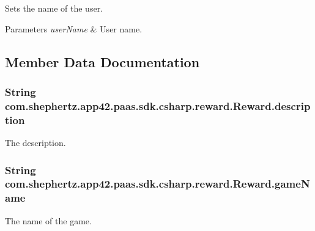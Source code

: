 Sets the name of the user. 


\begin{DoxyParams}{Parameters}
{\em user\+Name} & User name.\\
\hline
\end{DoxyParams}


\subsection{Member Data Documentation}
\hypertarget{classcom_1_1shephertz_1_1app42_1_1paas_1_1sdk_1_1csharp_1_1reward_1_1_reward_af47d9b6832d16cea33fbb19207ad0c5a}{
\subsubsection[{description}]{\setlength{\rightskip}{0pt plus 5cm}String com.\+shephertz.\+app42.\+paas.\+sdk.\+csharp.\+reward.\+Reward.\+description}}\label{classcom_1_1shephertz_1_1app42_1_1paas_1_1sdk_1_1csharp_1_1reward_1_1_reward_af47d9b6832d16cea33fbb19207ad0c5a}


The description. 

\hypertarget{classcom_1_1shephertz_1_1app42_1_1paas_1_1sdk_1_1csharp_1_1reward_1_1_reward_a829138697d56a2827f29e7df7e8ec610}{
\subsubsection[{game\+Name}]{\setlength{\rightskip}{0pt plus 5cm}String com.\+shephertz.\+app42.\+paas.\+sdk.\+csharp.\+reward.\+Reward.\+game\+Name}}\label{classcom_1_1shephertz_1_1app42_1_1paas_1_1sdk_1_1csharp_1_1reward_1_1_reward_a829138697d56a2827f29e7df7e8ec610}


The name of the game. 

